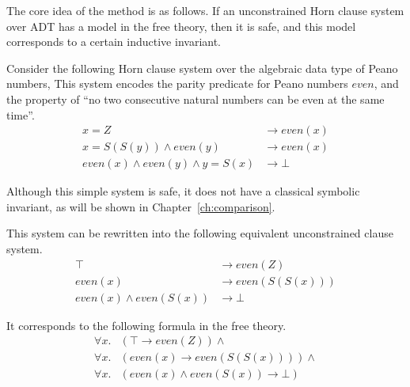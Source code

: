 The core idea of the method is as follows. If an unconstrained Horn clause system over ADT has a model in the free theory, then it is safe, and this model corresponds to a certain inductive invariant.

\begin{example}\label{ex:evenNat}
Consider the following Horn clause system over the algebraic data type of Peano numbers, This system encodes the parity predicate for Peano numbers $even$, and the property of ``no two consecutive natural numbers can be even at the same time''.
\begin{align}
    x = Z &\rightarrow even(x)\\
    x = S(S(y)) \land even(y) &\rightarrow even(x)\\
    even(x) \land even(y) \land y = S(x) &\rightarrow \bot
\end{align}


Although this simple system is safe, it does not have a classical symbolic invariant, as will be shown in Chapter~\ref{ch:comparison}.
\end{example}

This system can be rewritten into the following equivalent unconstrained clause system.
\begin{align*}
    \top &\rightarrow even(Z)\\
    even(x) &\rightarrow even(S(S(x)))\\
    even(x) \land even(S(x))&\rightarrow \bot
\end{align*}

It corresponds to the following formula in the free theory.
\begin{align*}
    \forall x. &(\top \rightarrow even(Z))\land \\
    \forall x. &(even(x) \rightarrow even(S(S(x))))\land \\
    \forall x. &(even(x) \land even(S(x))\rightarrow \bot)
\end{align*}

